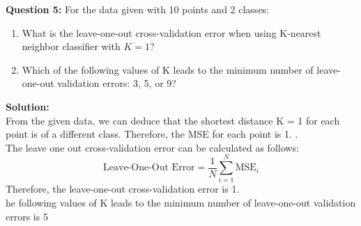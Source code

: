 \documentclass[a4paper,12pt]{article}
\begin{document}
\textbf{Question 5:}
For the data given with 10 points and 2 classes:
\begin{enumerate}
    \item What is the leave-one-out cross-validation error when using K-nearest neighbor classifier with \( K = 1 \)?
    \item Which of the following values of K leads to the minimum number of leave-one-out validation errors: 3, 5, or 9?
\end{enumerate}
\textbf{Solution:}\\
From the given data, we can deduce that the shortest distance K = 1 for each point is of a different class. 
Therefore, the MSE for each point is 1. .\\
The leave one out cross-validation error can be calculated as follows:
\[
\text{Leave-One-Out Error} = \frac{1}{N} \sum_{i=1}^{N} \text{MSE}_i
\]
Therefore, the leave-one-out cross-validation error is 1.\\
he following values of K leads to the minimum number of leave-one-out validation errors is 5
\end{document}
